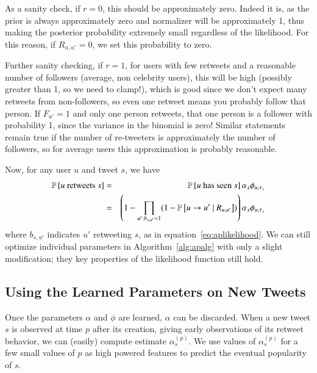 As a sanity check, if $r=0$, this should be approximately zero.
Indeed it is, as the prior is always approximately zero and normalizer will be approximately 1, thus making the posterior probability extremely small regardless of the likelihood.  
For this reason, if $R_{u,u'}=0$, we set this probability to zero.

Further sanity checking, if $r=1$, for users with few retweets and a reasonable number of followers (average, non celebrity users), this will be high (possibly greater than 1, so we need to clamp!), which is good since we don't expect many retweets from non-followers, so even one retweet means you probably follow that person.  
If $F_{u'}=1$ and only one person retweets, that one person is a follower with probability 1, since the variance in the binomial is zero!  Similar statements remain true if the number of re-tweeters is approximately the number of followers, so for average users this approximation is probably reasonable.  

Now, for any user $u$ and tweet $s$, we have
\begin{eqnarray}
  \mathbb{P} \left[\mbox{$u$ retweets $s$}\right] &=& \mathbb{P} \left[\mbox{$u$ has seen $s$}\right]\alpha_s\phi_{u,\tau_s}\nonumber\\
  &=&\left(1-\prod_{u':b_{s,u'}=1}(1-\mathbb{P} \left[u\to u'~|~R_{u,u'}\right])\right)\alpha_s\phi_{u,\tau_s}\label{eq:apeqfinal}
\end{eqnarray}
where $b_{s,u'}$ indicates $u'$ retweeting $s$, as in equation~\eqref{eq:aplikelihood}.  
We can still optimize individual parameters in Algorithm~\ref{alg:apalg} with only a slight modification; they key properties of the likelihood function still hold.  

\subsection{Using the Learned Parameters on New Tweets}

Once the parameters $\alpha$  and $\phi$ are learned, $\alpha$ can be discarded.
When a new tweet $s$ is observed at time $p$ after its creation, giving early observations of its retweet behavior, we can (easily) compute estimate $\alpha_s^{(p)}$.
We use values of $\alpha_s^{(p)}$ for a few small values of $p$ as high powered features to predict the eventual popularity of $s$.


